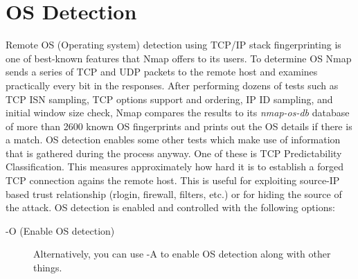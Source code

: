 \documentclass[times, utf8, seminar,english]{fer}
\begin{document}
\section{OS Detection}
Remote OS (Operating system) detection using TCP/IP stack fingerprinting is one of best-known features that Nmap offers to its users. To determine OS Nmap sends a series of TCP and UDP packets to the remote host and examines practically every bit in the responses. After performing dozens of tests such as TCP ISN sampling, TCP options support and ordering, IP ID sampling, and initial window size check, Nmap compares the results to its \textit{nmap-os-db} database of more than 2600 known OS fingerprints and prints out the OS details if there is a match. OS detection enables some other tests which make use of information that is gathered during the process anyway. One of these is TCP Predictability Classification. This measures approximately how hard it is to establish a forged TCP connection agains the remote host. This is useful for exploiting source-IP based trust relationship (rlogin, firewall, filters, etc.) or for hiding the source of the attack. OS detection is enabled and controlled with the following options:
\begin{description}
	\item [-O (Enable OS detection)] Alternatively, you can use -A to enable OS detection along with other things.
\end{description}
\pagebreak
\end{document}
